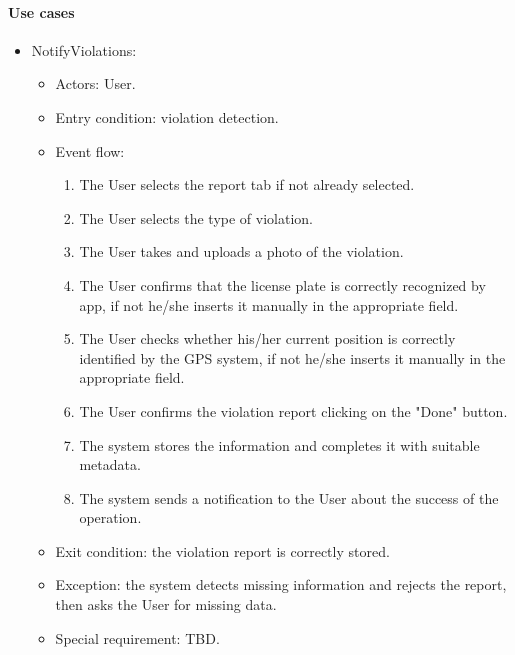 \paragraph{Use cases}
    \begin{itemize}
        \item NotifyViolations:
        \begin{itemize}
            \item Actors: User.
            \item Entry condition: violation detection.
            \item Event flow:
            \begin{enumerate}
                \item The User selects the report tab if not already selected.
                \item The User selects the type of violation.
                \item The User takes and uploads a photo of the violation.
                \item The User confirms that the license plate is correctly recognized by app, if not he/she inserts it manually in the appropriate field.
                \item The User checks whether his/her current position is correctly identified by the GPS system, if not he/she inserts it manually in the appropriate field.
                \item The User confirms the violation report clicking on the "Done" button.
                \item The system stores the information and completes it with suitable metadata.
                \item The system sends a notification to the User about the success of the operation.
            \end{enumerate}
            \item Exit condition: the violation report is correctly stored.
            \item Exception: the system detects missing information and rejects the report, then asks the User for missing data.
            \item Special requirement: TBD.
        \end{itemize}
        

\end{itemize}
